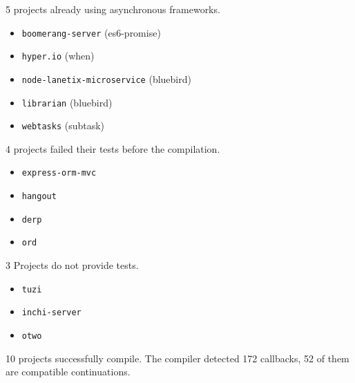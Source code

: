 5 projects already using asynchronous frameworks.
\begin{itemize}
\item \texttt{boomerang-server} (es6-promise)
\item \texttt{hyper.io} (when)
\item \texttt{node-lanetix-microservice} (bluebird)
\item \texttt{librarian} (bluebird)
\item \texttt{webtasks} (subtask)
\end{itemize}

4 projects failed their tests before the compilation.
\begin{itemize}
\item \texttt{express-orm-mvc}
\item \texttt{hangout}
\item \texttt{derp}
\item \texttt{ord}
\end{itemize}

3 Projects do not provide tests.
\begin{itemize}
\item \texttt{tuzi}
\item \texttt{inchi-server}
\item \texttt{otwo}
\end{itemize}

10 projects successfully compile.
The compiler detected 172 callbacks, 52 of them are compatible continuations.



